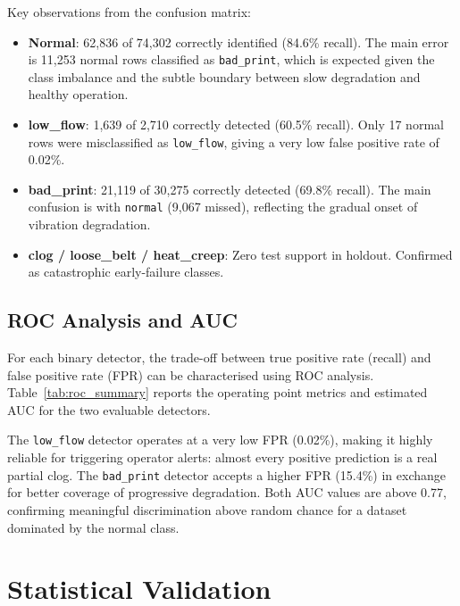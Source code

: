 Key observations from the confusion matrix:
\begin{itemize}
    \item \textbf{Normal}: 62,836 of 74,302 correctly identified (84.6\% recall). The
          main error is 11,253 normal rows classified as \texttt{bad\_print}, which is
          expected given the class imbalance and the subtle boundary between slow degradation
          and healthy operation.
    \item \textbf{low\_flow}: 1,639 of 2,710 correctly detected (60.5\% recall). Only 17
          normal rows were misclassified as \texttt{low\_flow}, giving a very low false
          positive rate of 0.02\%.
    \item \textbf{bad\_print}: 21,119 of 30,275 correctly detected (69.8\% recall). The
          main confusion is with \texttt{normal} (9,067 missed), reflecting the gradual
          onset of vibration degradation.
    \item \textbf{clog / loose\_belt / heat\_creep}: Zero test support in holdout.
          Confirmed as catastrophic early-failure classes.
\end{itemize}

\subsection{ROC Analysis and AUC}
\label{sec:roc}

For each binary detector, the trade-off between true positive rate (recall) and false
positive rate (FPR) can be characterised using ROC analysis. Table~\ref{tab:roc_summary}
reports the operating point metrics and estimated AUC for the two evaluable detectors.

\begin{table}[H]
\centering
\caption{ROC operating point and estimated AUC per binary detector}
\label{tab:roc_summary}

\end{table}

The \texttt{low\_flow} detector operates at a very low FPR (0.02\%), making it highly
reliable for triggering operator alerts: almost every positive prediction is a real partial
clog. The \texttt{bad\_print} detector accepts a higher FPR (15.4\%) in exchange for
better coverage of progressive degradation. Both AUC values are above 0.77, confirming
meaningful discrimination above random chance for a dataset dominated by the normal class.

\section{Statistical Validation}
\label{sec:statistical}

